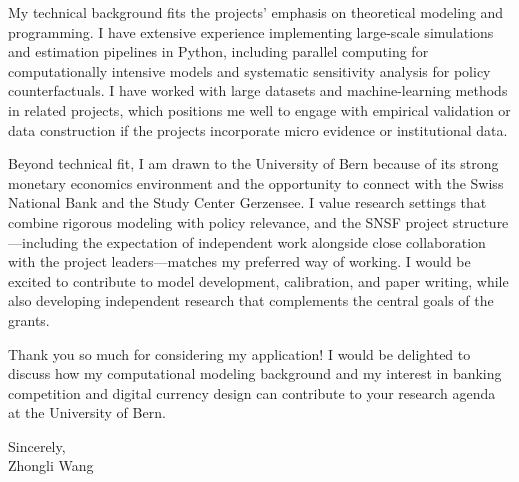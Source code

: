 \documentclass[11pt]{article}
\begin{document}
My technical background fits the projects' emphasis on theoretical modeling and programming. I have extensive experience implementing large-scale simulations and estimation pipelines in Python, including parallel computing for computationally intensive models and systematic sensitivity analysis for policy counterfactuals. 
I have worked with large datasets and machine-learning methods in related projects, which positions me well to engage with empirical validation or data construction if the projects incorporate micro evidence or institutional data.

Beyond technical fit, I am drawn to the University of Bern because of its strong monetary economics environment and the opportunity to connect with the Swiss National Bank and the Study Center Gerzensee. I value research settings that combine rigorous modeling with policy relevance, and the SNSF project structure---including the expectation of independent work alongside close collaboration with the project leaders---matches my preferred way of working. I would be excited to contribute to model development, calibration, and paper writing, while also developing independent research that complements the central goals of the grants.

Thank you so much for considering my application! I would be delighted to discuss how my computational modeling background and my interest in banking competition and digital currency design can contribute to your research agenda at the University of Bern.

\vspace{6mm}

\noindent Sincerely,\\[12mm]
\noindent Zhongli Wang
\end{document}
